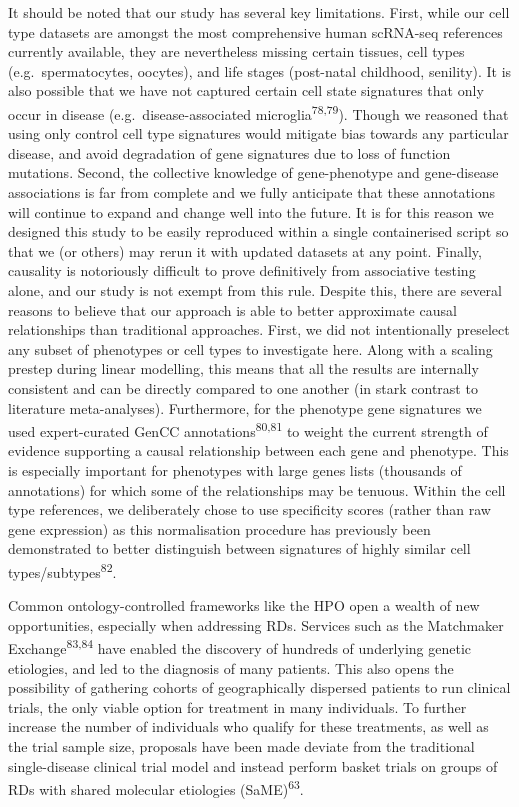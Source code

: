 \documentclass[
]{report}
\begin{document}
It should be noted that our study has several key limitations. First,
while our cell type datasets are amongst the most comprehensive human
scRNA-seq references currently available, they are nevertheless missing
certain tissues, cell types (e.g.~spermatocytes, oocytes), and life
stages (post-natal childhood, senility). It is also possible that we
have not captured certain cell state signatures that only occur in
disease (e.g.~disease-associated microglia\textsuperscript{78,79}).
Though we reasoned that using only control cell type signatures would
mitigate bias towards any particular disease, and avoid degradation of
gene signatures due to loss of function mutations. Second, the
collective knowledge of gene-phenotype and gene-disease associations is
far from complete and we fully anticipate that these annotations will
continue to expand and change well into the future. It is for this
reason we designed this study to be easily reproduced within a single
containerised script so that we (or others) may rerun it with updated
datasets at any point. Finally, causality is notoriously difficult to
prove definitively from associative testing alone, and our study is not
exempt from this rule. Despite this, there are several reasons to
believe that our approach is able to better approximate causal
relationships than traditional approaches. First, we did not
intentionally preselect any subset of phenotypes or cell types to
investigate here. Along with a scaling prestep during linear modelling,
this means that all the results are internally consistent and can be
directly compared to one another (in stark contrast to literature
meta-analyses). Furthermore, for the phenotype gene signatures we used
expert-curated GenCC annotations\textsuperscript{80,81} to weight the
current strength of evidence supporting a causal relationship between
each gene and phenotype. This is especially important for phenotypes
with large genes lists (thousands of annotations) for which some of the
relationships may be tenuous. Within the cell type references, we
deliberately chose to use specificity scores (rather than raw gene
expression) as this normalisation procedure has previously been
demonstrated to better distinguish between signatures of highly similar
cell types/subtypes\textsuperscript{82}.

Common ontology-controlled frameworks like the HPO open a wealth of new
opportunities, especially when addressing RDs. Services such as the
Matchmaker Exchange\textsuperscript{83,84} have enabled the discovery of
hundreds of underlying genetic etiologies, and led to the diagnosis of
many patients. This also opens the possibility of gathering cohorts of
geographically dispersed patients to run clinical trials, the only
viable option for treatment in many individuals. To further increase the
number of individuals who qualify for these treatments, as well as the
trial sample size, proposals have been made deviate from the traditional
single-disease clinical trial model and instead perform basket trials on
groups of RDs with shared molecular etiologies
(SaME)\textsuperscript{63}.
\end{document}
